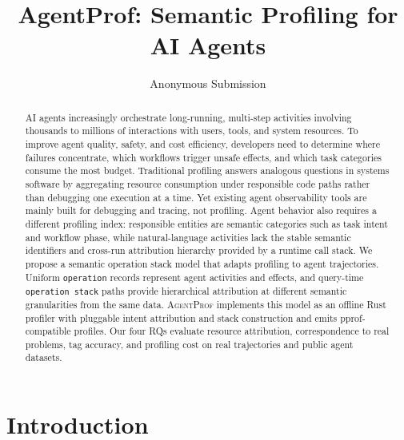 \documentclass[letterpaper]{article}
\newcommand{\sys}{\textsc{AgentProf}\xspace}
\newcommand{\operation}{\texttt{operation}\xspace}
\newcommand{\opstack}{\texttt{operation stack}\xspace}
\begin{document}
\title{AgentProf: Semantic Profiling for AI Agents}
\author{Anonymous Submission}
\affiliations{}

\maketitle

\begin{abstract}
AI agents increasingly orchestrate long-running, multi-step activities
involving thousands to millions of interactions with users, tools, and system
resources. To improve agent quality, safety, and cost efficiency, developers
need to determine where failures concentrate, which workflows trigger unsafe
effects, and which task categories consume the most budget. Traditional
profiling answers analogous questions in systems software by aggregating
resource consumption under responsible code paths rather than debugging one
execution at a time. Yet existing agent observability tools are mainly built
for debugging and tracing, not profiling. Agent behavior also requires a
different profiling index: responsible entities are semantic categories such
as task intent and workflow phase, while natural-language activities lack the
stable semantic identifiers and cross-run attribution hierarchy provided by a
runtime call stack. We propose a semantic operation stack model that adapts
profiling to agent trajectories. Uniform \operation{} records represent agent
activities and effects, and query-time \opstack{} paths provide hierarchical
attribution at different semantic granularities from the same data. \sys
implements this model as an offline Rust profiler with pluggable intent
attribution and stack construction and emits pprof-compatible profiles. Our
four RQs evaluate resource attribution, correspondence to real problems, tag
accuracy, and profiling cost on real trajectories and public agent datasets.
\end{abstract}

\section{Introduction}
\label{sec:intro}
\end{document}
